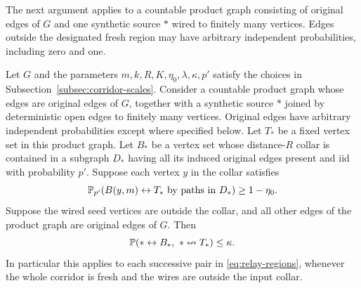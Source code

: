 The next argument applies to a countable product graph consisting of
original edges of $G$ and one synthetic source $*$ wired to finitely
many vertices. Edges outside the designated fresh region may have
arbitrary independent probabilities, including zero and one.

\begin{proposition}\label{prop:transfer}
Let $G$ and the parameters $m,k,R,K,\eta_0,\lambda,\kappa,p'$ satisfy
the choices in Subsection~\ref{subsec:corridor-scales}. Consider a
countable product graph whose edges are original edges of $G$,
together with a synthetic source $*$ joined by deterministic open
edges to finitely many vertices. Original edges have arbitrary
independent probabilities except where specified below.
Let $T_*$ be a fixed vertex set in this product graph.
Let $B_*$ be a vertex set whose distance-$R$ collar is contained in a
subgraph $D_*$ having all its induced original edges present and iid
with probability $p'$. Suppose each vertex $y$ in the collar satisfies
\[
 \mathbb P_{p'}(B(y,m)\leftrightarrow T_*\text{ by paths in }D_*)
       \ge1-\eta_0.
\]
Suppose the wired seed vertices are outside the collar, and all other
edges of the product graph are original edges of $G$. Then
\begin{equation}\label{eq:fresh-collar-transfer}
 \mathbb P(*\leftrightarrow B_*,\ *\nleftrightarrow T_*)\le\kappa.
\end{equation}
In particular this applies to each successive pair in
\eqref{eq:relay-regions}, whenever the whole corridor is fresh and
the wires are outside the input collar.
\end{proposition}

